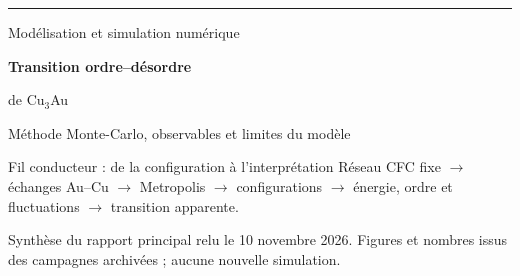 \documentclass[aspectratio=169,10pt]{beamer}
\newcommand{\src}[1]{{\fontsize{6.5}{7.5}\selectfont\color{teal}#1\par}}
\begin{document}
\begin{frame}[plain]
\vspace{4mm}
{\color{teal}\rule{\linewidth}{1.3pt}}
\vspace{5mm}
{\fontsize{12}{14}\selectfont Modélisation et simulation numérique\par}
\vspace{4mm}
{\fontsize{28}{32}\selectfont\bfseries Transition ordre--désordre\par de Cu$_3$Au\par}
\vspace{4mm}
{\fontsize{13}{16}\selectfont Méthode Monte-Carlo, observables et limites du modèle\par}
\vspace{6mm}
\begin{block}{Fil conducteur : de la configuration à l'interprétation}
Réseau CFC fixe $\to$ échanges Au--Cu $\to$ Metropolis $\to$ configurations
$\to$ énergie, ordre et fluctuations $\to$ transition apparente.
\end{block}
\vfill
\src{Synthèse du rapport principal relu le 10 novembre 2026. Figures et nombres issus des campagnes archivées ; aucune nouvelle simulation.}
\end{frame}
\end{document}
